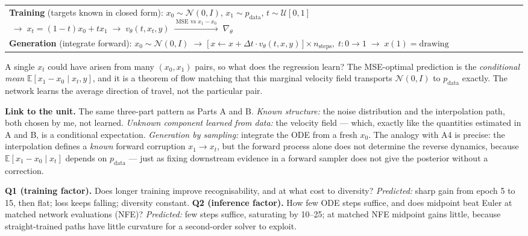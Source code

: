 \documentclass[10pt,a4paper]{article}
\begin{document}
\begin{center}\small
\begin{tabular}{@{}l@{}}
\hline
\textbf{Training} (targets known in closed form): \;
$x_0\sim\mathcal{N}(0,I)$, $x_1\sim p_{\text{data}}$, $t\sim\mathcal{U}[0,1]$
$\;\to\;x_t=(1{-}t)x_0{+}tx_1\;\to\;v_\theta(t,x_t,y)\;\xrightarrow{\ \text{MSE vs }x_1-x_0\ }\;\nabla_\theta$\\
\textbf{Generation} (integrate forward): \;
$x_0\sim\mathcal{N}(0,I)\;\to\;\big[\,x\leftarrow x+\Delta t\cdot v_\theta(t,x,y)\,\big]\times n_{\text{steps}},\; t:0\to1\;\to\;x(1)=\text{drawing}$\\
\hline
\end{tabular}
\end{center}

A single $x_t$ could have arisen from many $(x_0,x_1)$ pairs, so what does the regression learn? The
MSE-optimal prediction is the \emph{conditional mean} $\mathbb{E}[x_1-x_0\mid x_t,y]$, and it is a
theorem of flow matching that this marginal velocity field transports $\mathcal{N}(0,I)$ to
$p_{\text{data}}$ exactly. The network learns the average direction of travel, not the particular pair.

\textbf{Link to the unit.} The same three-part pattern as Parts A and B. \emph{Known structure:} the
noise distribution and the interpolation path, both chosen by me, not learned. \emph{Unknown component
learned from data:} the velocity field --- which, exactly like the quantities estimated in A and B, is
a conditional expectation. \emph{Generation by sampling:} integrate the ODE from a fresh $x_0$. The
analogy with A4 is precise: the interpolation defines a \emph{known} forward corruption
$x_1\to x_t$, but the forward process alone does not determine the reverse dynamics, because
$\mathbb{E}[x_1-x_0\mid x_t]$ depends on $p_{\text{data}}$ --- just as fixing downstream evidence in a
forward sampler does not give the posterior without a correction.

\textbf{Q1 (training factor).} Does longer training improve recognisability, and at what cost to
diversity? \emph{Predicted:} sharp gain from epoch 5 to 15, then flat; loss keeps falling; diversity
constant. \textbf{Q2 (inference factor).} How few ODE steps suffice, and does midpoint beat Euler at
matched network evaluations (NFE)? \emph{Predicted:} few steps suffice, saturating by 10--25; at
matched NFE midpoint gains little, because straight-trained paths have little curvature for a
second-order solver to exploit.
\end{document}

